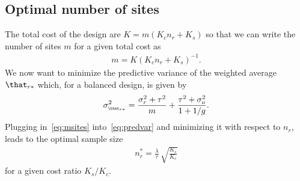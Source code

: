 \begin{subappendices}
\subsection{Optimal number of sites}
\label{sec:multi}
The total cost of the design are $K = m(K_{c}n_{r} + K_{s})$ so that we can
write the number of sites $m$ for a given total cost as
\begin{align}
  \label{eq:msites}
  m = K (K_{c}n_{r} + K_{s})^{-1}.
\end{align}
We now want to minimize the predictive variance of the weighted average
$\that_{r*}$ which, for a balanced design, is given by
\begin{align}
  \label{eq:predvar}
  \sigma^{2}_{\scriptscriptstyle \that_{r*}}
  = \frac{\sigma^{2}_{r} + \tau^{2}}{m} + \frac{\tau^{2} + \sigma^{2}_{o}}{1 + 1/g}.
\end{align}
Plugging in~\eqref{eq:msites} into~\eqref{eq:predvar} and minimizing it with
respect to $n_{r}$, leads to the optimal sample size
\begin{align*}
  n_{r}^{*}
  = \frac{\lambda}{\tau} \, \sqrt{\frac{K_{s}}{K_{c}}}
\end{align*}
for a given cost ratio $K_{s}/K_{c}$.

\begin{figure}[!htb]


\end{figure}
\end{subappendices}
